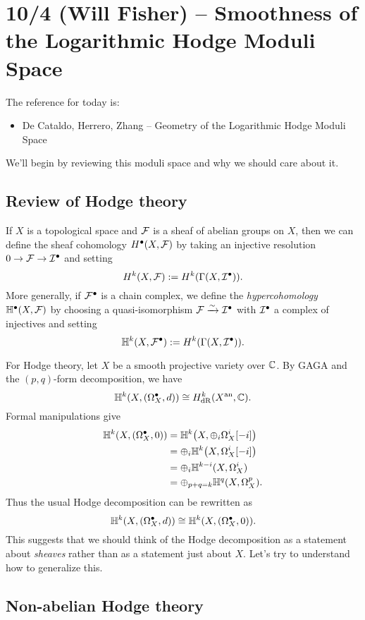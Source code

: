 \documentclass{amsart}
\begin{document}
\section{10/4 (Will Fisher) -- Smoothness of the Logarithmic Hodge Moduli Space}

The reference for today is:
\begin{itemize}
	\item De Cataldo, Herrero, Zhang -- Geometry of the Logarithmic Hodge Moduli Space
\end{itemize}

We'll begin by reviewing this moduli space and why we should care about it.

\subsection{Review of Hodge theory}

If $X$ is a topological space and $\mathcal{F}$ is a sheaf of abelian groups on $X$, then we can define the sheaf cohomology $H^\bullet(X, \mathcal{F})$ by taking an injective resolution $0 \to \mathcal{F} \to \mathcal{I}^\bullet$ and setting
\[
	H^k(X, \mathcal{F}) := H^k(\Gamma(X, \mathcal{I}^\bullet)).
\]
More generally, if $\mathcal{F}^\bullet$ is a chain complex, we define the \emph{hypercohomology} $\mathbb{H}^\bullet(X, \mathcal{F})$ by choosing a quasi-isomorphism $\mathcal{F} \xrightarrow{\sim} \mathcal{I}^\bullet$ with $\mathcal{I}^\bullet$ a complex of injectives and setting
\[
	\mathbb{H}^k(X, \mathcal{F}^\bullet) := H^k(\Gamma(X, \mathcal{I}^\bullet)).
\]

For Hodge theory, let $X$ be a smooth projective variety over $\mathbb{C}$.
By GAGA and the $(p, q)$-form decomposition, we have
\[
	\mathbb{H}^k(X, (\Omega_X^\bullet, d)) \cong H^k_{\mathrm{dR}}(X^{\mathrm{an}}, \mathbb{C}).
\]
Formal manipulations give
\begin{align*}
	\mathbb{H}^k(X, (\Omega_X^\bullet, 0)) &= \mathbb{H}^k\big(X, \oplus_i \Omega_X^i [-i]\big) \\
					&= \oplus_i \mathbb{H}^k\big(X, \Omega_X^i [-i]\big) \\
					&= \oplus_i \mathbb{H}^{k-i}(X, \Omega_X^i) \\
					&= \oplus_{p+q=k} \mathbb{H}^q(X, \Omega_X^p).
\end{align*}
Thus the usual Hodge decomposition can be rewritten as
\[
	\mathbb{H}^k(X, (\Omega_X^\bullet, d)) \cong \mathbb{H}^k(X, (\Omega_X^\bullet, 0)).
\]
This suggests that we should think of the Hodge decomposition as a statement about \emph{sheaves} rather than as a statement just about $X$.
Let's try to understand how to generalize this.

\subsection{Non-abelian Hodge theory}
\end{document}
